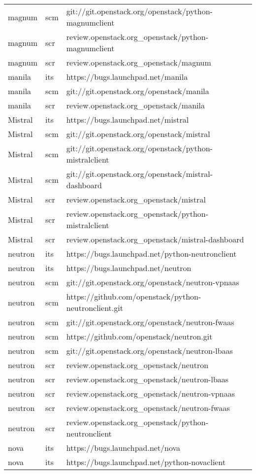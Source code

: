 \begin{center}
\begin{longtable}{|p{4cm}|p{1cm}|p{10cm}|}
magnum&scm&git://git.openstack.org/openstack/python-magnumclient\\ 
magnum&scr&review.openstack.org\_openstack/python-magnumclient\\ 
magnum&scr&review.openstack.org\_openstack/magnum\\ 
manila&its&https://bugs.launchpad.net/manila\\ 
manila&scm&git://git.openstack.org/openstack/manila\\ 
manila&scr&review.openstack.org\_openstack/manila\\ 
Mistral&its&https://bugs.launchpad.net/mistral\\ 
Mistral&scm&git://git.openstack.org/openstack/mistral\\ 
Mistral&scm&git://git.openstack.org/openstack/python-mistralclient\\ 
Mistral&scm&git://git.openstack.org/openstack/mistral-dashboard\\ 
Mistral&scr&review.openstack.org\_openstack/mistral\\ 
Mistral&scr&review.openstack.org\_openstack/python-mistralclient\\ 
Mistral&scr&review.openstack.org\_openstack/mistral-dashboard\\ 
neutron&its&https://bugs.launchpad.net/python-neutronclient\\ 
neutron&its&https://bugs.launchpad.net/neutron\\ 
neutron&scm&git://git.openstack.org/openstack/neutron-vpnaas\\ 
neutron&scm&https://github.com/openstack/python-neutronclient.git\\ 
neutron&scm&git://git.openstack.org/openstack/neutron-fwaas\\ 
neutron&scm&https://github.com/openstack/neutron.git\\ 
neutron&scm&git://git.openstack.org/openstack/neutron-lbaas\\ 
neutron&scr&review.openstack.org\_openstack/neutron\\ 
neutron&scr&review.openstack.org\_openstack/neutron-lbaas\\ 
neutron&scr&review.openstack.org\_openstack/neutron-vpnaas\\ 
neutron&scr&review.openstack.org\_openstack/neutron-fwaas\\ 
neutron&scr&review.openstack.org\_openstack/python-neutronclient\\ 
nova&its&https://bugs.launchpad.net/nova\\ 
nova&its&https://bugs.launchpad.net/python-novaclient\\ 

\end{longtable}
\end{center}
